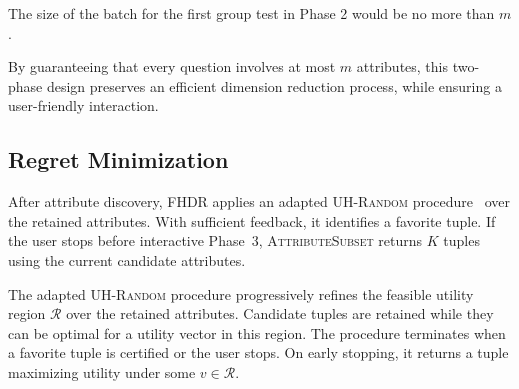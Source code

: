 \begin{theorem}\label{theorem_batch}
    The size of the batch for the first group test in Phase 2 would be no more than $m$.
\end{theorem}

By guaranteeing that every question involves at most $m$ attributes, this two-phase design preserves an efficient dimension reduction process, while ensuring a user-friendly interaction.

\FloatBarrier

\subsection{Regret Minimization}
\label{subsec:re_min}

After attribute discovery, FHDR applies an adapted \textsc{UH-Random} procedure~\cite{XCL19} over the retained attributes. With sufficient feedback, it identifies a favorite tuple. If the user stops before interactive Phase~3, \textsc{AttributeSubset} returns $K$ tuples using the current candidate attributes.

The adapted \textsc{UH-Random} procedure progressively refines the feasible utility region $\mathcal{R}$ over the retained attributes. Candidate tuples are retained while they can be optimal for a utility vector in this region. The procedure terminates when a favorite tuple is certified or the user stops. On early stopping, it returns a tuple maximizing utility under some $v\in\mathcal{R}$.

